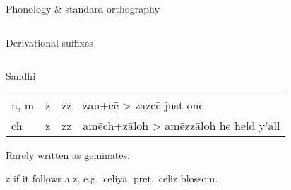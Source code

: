 \documentclass[12pt]{beamer}
\newcommand{\nah}[1]{\textcolor{nahgrn}{#1}}
\newcommand{\trs}[1]{\textcolor{nahblu}{#1}}
\begin{document}
\begin{frame}
\begin{columns}[t]
\begin{column}{.22\linewidth}
\begin{block}{Phonology \& standard orthography}
\begin{threeparttable}
\begin{tablenotes}
\begin{frame}
\begin{columns}[t]
\begin{column}{.22\linewidth}
\begin{block}{Derivational suffixes}
\begin{threeparttable}
\begin{multicols}{2}
\begin{itemize}
\begin{column}{.26\linewidth}
\begin{block}{Sandhi}
\begin{threeparttable}
\begin{tabular}{l@{+ }l@{> }ll}
            \nah{n, m} & \nah{z}  & \nah{zz}\tnote{1}     & \nah{zan}+\nah{cē} > \nah{zazcē} \trs{just one}                 \\
            \nah{ch}   & \nah{z}  & \nah{zz}\tnote{1}     & \nah{amēch}+\nah{zāloh} > \nah{amēzzāloh} \trs{he held y'all}   \\
          \end{tabular}%
          \begin{tablenotes}
            \item[1] Rarely written as geminates.
            \item[2] \nah{z} if it follows a \nah{z}, e.g.~\nah{celiya}, pret.~\nah{celiz} \trs{blossom}.

          \end{tablenotes}
        \end{threeparttable}
      \end{block}


\end{column}
\end{itemize}
\end{multicols}
\end{threeparttable}
\end{block}
\end{column}
\end{columns}
\end{frame}
\end{tablenotes}
\end{threeparttable}
\end{block}
\end{column}
\end{columns}
\end{frame}
\end{document}
